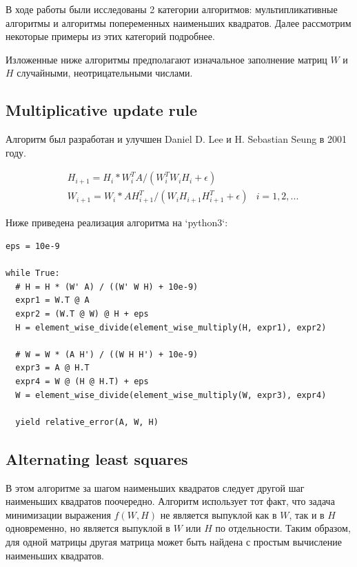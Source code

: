 \documentclass[14pt]{extarticle}
\makeatletter
\newcommand{\verbatimfont}[1]{\renewcommand{\verbatim@font}{\ttfamily#1}}
\makeatother
\begin{document}
В ходе работы были исследованы 2 категории алгоритмов: мультипликативные алгоритмы и алгоритмы попеременных наименьших квадратов. Далее рассмотрим некоторые примеры из этих категорий подробнее.

Изложенные ниже алгоритмы предполагают изначальное заполнение матриц $W$ и $H$ случайными, неотрицательными числами.


\newpage


\subsection{Multiplicative update rule}

Алгоритм был разработан и улучшен Daniel D. Lee и H. Sebastian Seung в 2001 году.

\begin{align*}
	& H_{i+1} = H_i * W_i^T A / (W_i^T W_i H_i + \epsilon) \\
	& W_{i+1} = W_i * A H_{i+1}^T / (W_i H_{i+1} H_{i+1}^T + \epsilon) & i = 1, 2, ...
\end{align*}

Ниже приведена реализация алгоритма на `python3`:

\verbatimfont{\small}
\begin{verbatim}
eps = 10e-9

while True:
  # H = H * (W' A) / ((W' W H) + 10e-9)
  expr1 = W.T @ A
  expr2 = (W.T @ W) @ H + eps
  H = element_wise_divide(element_wise_multiply(H, expr1), expr2)

  # W = W * (A H') / ((W H H') + 10e-9)
  expr3 = A @ H.T
  expr4 = W @ (H @ H.T) + eps
  W = element_wise_divide(element_wise_multiply(W, expr3), expr4)

  yield relative_error(A, W, H)
\end{verbatim}


\newpage


\subsection{Alternating least squares}

В этом алгоритме за шагом наименьших квадратов следует другой шаг наименьших квадратов поочередно. Алгоритм использует тот факт, что задача минимизации выражения $f(W, H)$ не является выпуклой как в $W$, так и в $H$ одновременно, но является выпуклой в $W$ или $H$ по отдельности. Таким образом, для одной матрицы другая матрица может быть найдена с простым вычисление наименьших квадратов.
\end{document}
